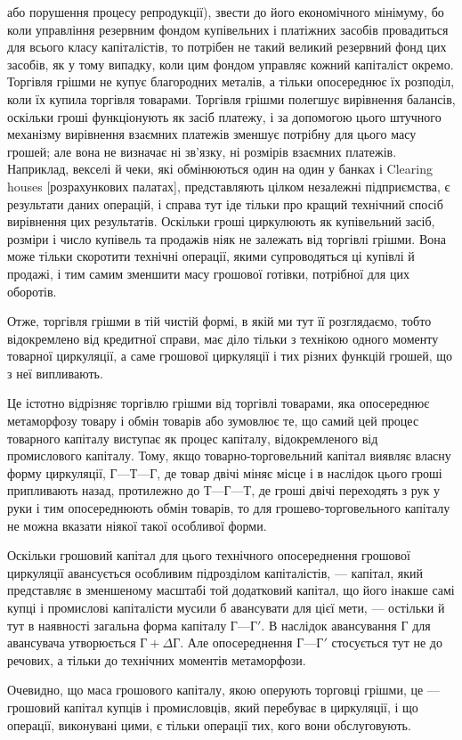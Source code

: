\parcont{}  %
або порушення процесу репродукції), звести до його економічного
мінімуму, бо коли управління резервним фондом купівельних
і платіжних засобів провадиться для всього класу капіталістів, то
потрібен не такий великий резервний фонд цих засобів, як у тому
випадку, коли цим фондом управляє кожний капіталіст окремо.
Торгівля грішми не купує благородних металів, а тільки опосереднює
їх розподіл, коли їх купила торгівля товарами. Торгівля грішми
полегшує вирівнення балансів, оскільки гроші функціонують як
засіб платежу, і за допомогою цього штучного механізму вирівнення
взаємних платежів зменшує потрібну для цього масу грошей;
але вона не визначає ні зв’язку, ні розмірів взаємних платежів.
Наприклад, векселі й чеки, які обмінюються один на один
у банках і Clearing houses [розрахункових палатах], представляють цілком
незалежні підприємства, є результати даних операцій,
і справа тут іде тільки про кращий технічний спосіб вирівнення
цих результатів. Оскільки гроші циркулюють як купівельний
засіб, розміри і число купівель та продажів ніяк не залежать
від торгівлі грішми. Вона може тільки скоротити технічні операції,
якими супроводяться ці купівлі й продажі, і тим самим
зменшити масу грошової готівки, потрібної для цих оборотів.

Отже, торгівля грішми в тій чистій формі, в якій ми тут її
розглядаємо, тобто відокремлено від кредитної справи, має діло
тільки з технікою одного моменту товарної циркуляції, а саме
грошової циркуляції і тих різних функцій грошей, що з неї випливають.

Це істотно відрізняє торгівлю грішми від торгівлі товарами,
яка опосереднює метаморфозу товару і обмін товарів або зумовлює
те, що самий цей процес товарного капіталу виступає
як процес капіталу, відокремленого від промислового капіталу.
Тому, якщо товарно-торговельний капітал виявляє власну форму
циркуляції, $Г — Т — Г$, де товар двічі міняє місце і в наслідок
цього гроші припливають назад, протилежно до $Т — Г — Т$,
де гроші двічі переходять з рук у руки і тим опосереднюють
обмін товарів, то для грошево-торговельного капіталу не можна
вказати ніякої такої особливої форми.

Оскільки грошовий капітал для цього технічного опосереднення
грошової циркуляції авансується особливим підрозділом
капіталістів, — капітал, який представляє в зменшеному масштабі
той додатковий капітал, що його інакше самі купці і промислові
капіталісти мусили б авансувати для цієї мети, — остільки й тут
в наявності загальна форма капіталу $Г — Г'$. В наслідок авансування
$Г$ для авансувача утворюється $Г + ΔГ$. Але опосереднення
$Г — Г'$ стосується тут не до речових, а тільки до технічних
моментів метаморфози.

Очевидно, що маса грошового капіталу, якою оперують торговці
грішми, це — грошовий капітал купців і промисловців, який
перебуває в циркуляції, і що операції, виконувані цими, є тільки
операції тих, кого вони обслуговують.
